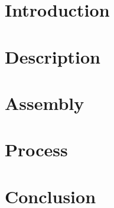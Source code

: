\documentclass[]{article}
\begin{document}

\tableofcontents
\listoffigures
\newpage

\section{Introduction}	
	
\newpage
\section{Description}
	
\section{Assembly}
\section{Process}

\section{Conclusion}
\end{document}
